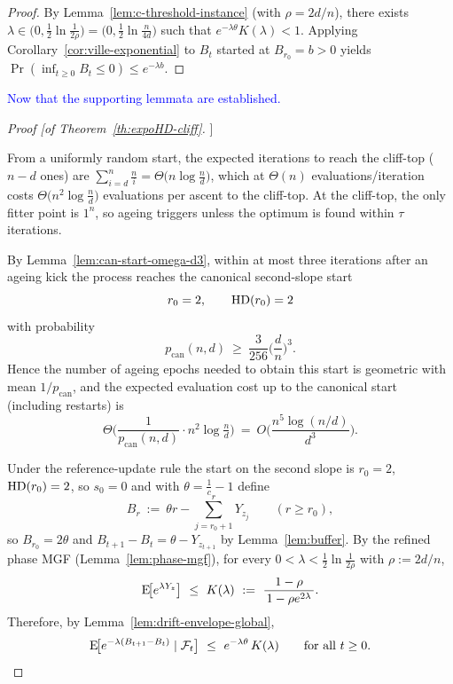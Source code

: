 \begin{proof}
	By Lemma~\ref{lem:c-threshold-instance} (with $\rho=2d/n$), there exists
	$\lambda\in\big(0,\tfrac12\ln\tfrac{1}{2\rho}\big)=\big(0,\tfrac12\ln\tfrac{n}{4d}\big)$
	such that $e^{-\lambda\theta}K(\lambda)<1$. Applying Corollary~\ref{cor:ville-exponential}
	to $B_t$ started at $B_{r_0}=b>0$ yields
	$\Pr(\inf_{t\ge 0} B_t\le 0)\le e^{-\lambda b}$.
\end{proof}

\textcolor{blue}{Now that the supporting lemmata are established.}


\begin{proof}[Proof [of Theorem~\ref{th:expoHD-cliff}]]
	
	From a uniformly random start, the expected iterations to reach the cliff-top ($n-d$ ones) are
	$\sum_{i=d}^{n}\frac{n}{i}=\Theta\!\big(n\log\tfrac{n}{d}\big)$, which at $\Theta(n)$ evaluations/iteration costs
	$\Theta\!\big(n^{2}\log\tfrac{n}{d}\big)$ evaluations per ascent to the cliff-top. At the cliff-top, the only fitter point is $1^n$, so ageing triggers unless the optimum is found within $\tau$ iterations.
	
	By Lemma~\ref{lem:can-start-omega-d3}, within at most three iterations after an ageing kick the process reaches the canonical second-slope start
	\[
	r_0=2,\qquad \text{HD}(r_0)=2
	\]
	with probability
	\[
	p_{\mathrm{can}}(n,d)\ \ge\ \frac{3}{256}\Big(\frac{d}{n}\Big)^{\!3}.
	\]
	Hence the number of ageing epochs needed to obtain this start is geometric with mean $1/p_{\mathrm{can}}$, and the expected evaluation cost up to the canonical start (including restarts) is
	\[
	\Theta\!\Big(\frac{1}{p_{\mathrm{can}}(n,d)}\cdot n^{2}\log\tfrac{n}{d}\Big)
	\ =\ O\!\Big(\frac{n^{5}\log(n/d)}{d^{3}}\Big).
	\]
	
	\smallskip
	Under the reference-update rule the start on the second slope is $r_0=2$, $\text{HD}(r_0)=2$, so $s_0=0$ and with $\theta=\tfrac1c-1$ define
	\[
	B_r\ :=\ \theta r - \sum_{j=r_0+1}^{r} Y_{z_j}\qquad(r\ge r_0),
	\]
	so $B_{r_0}=2\theta$ and $B_{t+1}-B_t=\theta-Y_{z_{t+1}}$ by Lemma~\ref{lem:buffer}.
	By the refined phase MGF (Lemma~\ref{lem:phase-mgf}), for every $0<\lambda<\tfrac12\ln\!\tfrac{1}{2\rho}$ with $\rho:=2d/n$,
	\[
	\EE\!\big[e^{\lambda Y_z}\big]\ \le\ K(\lambda)\ :=\ \frac{1-\rho}{\,1-\rho e^{2\lambda}\,}.
	\]
	Therefore, by Lemma~\ref{lem:drift-envelope-global},
	\[
	\text{E}\!\big[e^{-\lambda(B_{t+1}-B_t)}\mid\mathcal F_t\big]\ \le\ e^{-\lambda\theta}\,K(\lambda)\qquad\text{for all }t\ge 0.
	\]
	

\end{proof}
